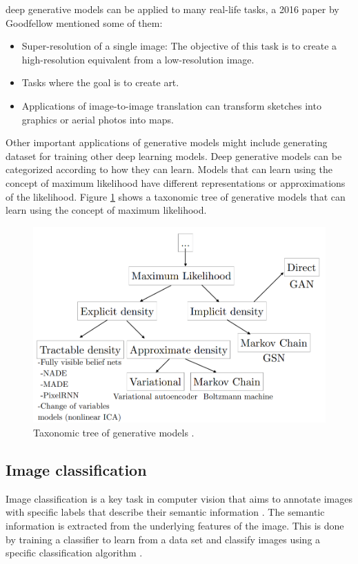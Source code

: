 \documentclass[12pt,twocolumn,a4paper]{article}
\begin{document}
    deep generative models can be applied to many real-life tasks, a 2016 paper by Goodfellow \cite{Goodfellow2016} mentioned some of them:
    \begin{itemize}
    \item Super-resolution of a single image: The objective of this task is to create a high-resolution equivalent from a low-resolution image.
    \item Tasks where the goal is to create art.
    \item Applications of image-to-image translation can transform sketches into graphics or aerial photos into maps.
    \end{itemize}
    \-\hspace{0.1cm} Other important applications of generative models might include generating dataset for training other deep learning models. Deep generative models can be categorized according to how they can learn. Models that can learn using the concept of maximum likelihood have different representations or approximations of the likelihood. Figure \ref{fig:cc} shows a taxonomic tree of generative models that can learn using the concept of maximum likelihood.
    \begin{figure}[htp]
        \centering
        \includegraphics[scale=0.3]{generative-models.png}
        \caption{\centering Taxonomic tree of generative models \cite{Goodfellow2016}.}
        \label{fig:cc}
    \end{figure}
    
    \subsection{Image classification}
    \hspace{0.3cm} Image classification is a key task in computer vision that aims to annotate images with specific labels that describe their semantic information \cite{Wu2020-kx}. The semantic information is extracted from the underlying features of the image. This is done by training a classifier to learn from a data set and classify images using a specific classification algorithm \cite{Wu2020-kx}. 
\end{document}
